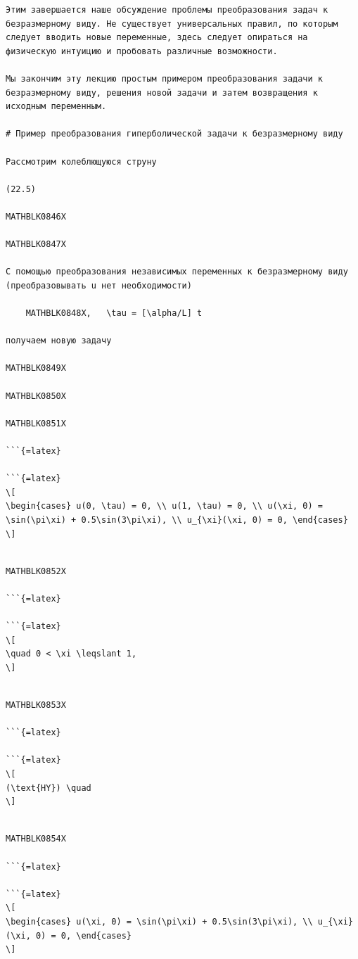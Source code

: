 \documentclass[
]{article}
\begin{document}
\begin{verbatim}
Этим завершается наше обсуждение проблемы преобразования задач к безразмерному виду. Не существует универсальных правил, по которым следует вводить новые переменные, здесь следует опираться на физическую интуицию и пробовать различные возможности.

Мы закончим эту лекцию простым примером преобразования задачи к безразмерному виду, решения новой задачи и затем возвращения к исходным переменным.

# Пример преобразования гиперболической задачи к безразмерному виду

Рассмотрим колеблющуюся струну

(22.5)

MATHBLK0846X

MATHBLK0847X

С помощью преобразования независимых переменных к безразмерному виду (преобразовывать u нет необходимости)

    MATHBLK0848X,   \tau = [\alpha/L] t

получаем новую задачу

MATHBLK0849X

MATHBLK0850X

MATHBLK0851X

```{=latex}

```{=latex}
\[
\begin{cases} u(0, \tau) = 0, \\ u(1, \tau) = 0, \\ u(\xi, 0) = \sin(\pi\xi) + 0.5\sin(3\pi\xi), \\ u_{\xi}(\xi, 0) = 0, \end{cases}
\]
\end{verbatim}

\begin{verbatim}

MATHBLK0852X

```{=latex}

```{=latex}
\[
\quad 0 < \xi \leqslant 1,
\]
\end{verbatim}

\begin{verbatim}

MATHBLK0853X

```{=latex}

```{=latex}
\[
(\text{HY}) \quad
\]
\end{verbatim}

\begin{verbatim}

MATHBLK0854X

```{=latex}

```{=latex}
\[
\begin{cases} u(\xi, 0) = \sin(\pi\xi) + 0.5\sin(3\pi\xi), \\ u_{\xi}(\xi, 0) = 0, \end{cases}
\]
\end{verbatim}
\end{document}
